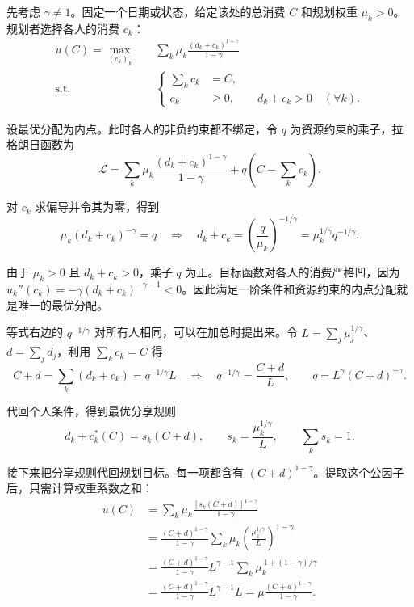 \begin{solution}[label-content={证明},blank-type=none]
先考虑 $\gamma\ne1$。固定一个日期或状态，给定该处的总消费 $C$ 和规划权重 $\mu_k>0$。规划者选择各人的消费 $c_k$：
\[
 \begin{aligned}
 u(C)=\max_{(c_k)_k}\quad &\sum_k\mu_k\frac{(d_k+c_k)^{1-\gamma}}{1-\gamma}\\
 \text{s.t.}\quad &
 \left\{\begin{aligned}
 \sum_k c_k&=C,\\
 c_k&\ge0,\qquad d_k+c_k>0\quad(\forall k).
 \end{aligned}\right.
 \end{aligned}
\]

设最优分配为内点。此时各人的非负约束都不绑定，令 $q$ 为资源约束的乘子，拉格朗日函数为
\[
 \mathcal L=\sum_k\mu_k\frac{(d_k+c_k)^{1-\gamma}}{1-\gamma}
             +q\left(C-\sum_k c_k\right).
\]

对 $c_k$ 求偏导并令其为零，得到
\[
 \mu_k(d_k+c_k)^{-\gamma}=q
 \quad\Longrightarrow\quad
 d_k+c_k=\left(\frac{q}{\mu_k}\right)^{-1/\gamma}
         =\mu_k^{1/\gamma}q^{-1/\gamma}.
\]

由于 $\mu_k>0$ 且 $d_k+c_ k>0$，乘子 $q$ 为正。目标函数对各人的消费严格凹，因为 $u_k''(c_k)=-\gamma(d_k+c_k)^{-\gamma-1}<0$。因此满足一阶条件和资源约束的内点分配就是唯一的最优分配。

等式右边的 $q^{-1/\gamma}$ 对所有人相同，可以在加总时提出来。令 $L=\sum_j\mu_j^{1/\gamma}$、$d=\sum_jd_j$，利用 $\sum_k c_k=C$ 得
\[
 C+d=\sum_k(d_k+c_k)=q^{-1/\gamma}L
 \quad\Longrightarrow\quad
 q^{-1/\gamma}=\frac{C+d}{L},
 \qquad
 q=L^\gamma(C+d)^{-\gamma}.
\]

代回个人条件，得到最优分享规则
\[
 d_k+c_k^*(C)=s_k(C+d),\qquad
 s_k=\frac{\mu_k^{1/\gamma}}{L},\qquad \sum_k s_k=1.
\]

接下来把分享规则代回规划目标。每一项都含有 $(C+d)^{1-\gamma}$。提取这个公因子后，只需计算权重系数之和：
\[
 \begin{aligned}
 u(C)
 &=\sum_k\mu_k\frac{[s_k(C+d)]^{1-\gamma}}{1-\gamma}\\
 &=\frac{(C+d)^{1-\gamma}}{1-\gamma}
   \sum_k\mu_k\left(\frac{\mu_k^{1/\gamma}}{L}\right)^{1-\gamma}\\
 &=\frac{(C+d)^{1-\gamma}}{1-\gamma}
   L^{\gamma-1}\sum_k\mu_k^{\,1+(1-\gamma)/\gamma}\\
 &=\frac{(C+d)^{1-\gamma}}{1-\gamma}
   L^{\gamma-1}L
 =\mu\frac{(C+d)^{1-\gamma}}{1-\gamma}.
 \end{aligned}
\]


\end{solution}
